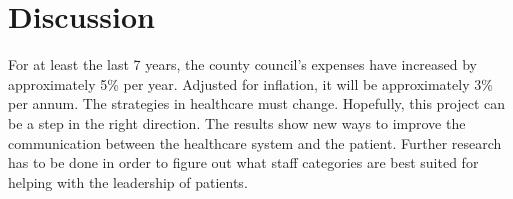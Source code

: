 \documentclass[12pt,a4paper,oneside]{article}
\let\oldcite\cite
\renewcommand*\cite[1]{\textsuperscript{\oldcite{#1}}}
\begin{document}



\section*{Discussion}
For at least the last 7 years, the county council's expenses have increased by approximately 5\% per year. Adjusted for inflation, it will be approximately 3\% per annum\cite{numbers3.1, numbers3.2}. The strategies in healthcare must change. Hopefully, this project can be a step in the right direction. The results show new ways to improve the communication between the healthcare system and the patient. Further research has to be done in order to figure out what staff categories are best suited for helping with the leadership of patients.

\end{document}
